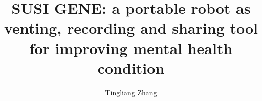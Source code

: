 \documentclass[manuscript,screen]{acmart}
\begin{document}
\title{SUSI GENE: a portable robot as venting, recording  and sharing tool for improving mental health condition}



\author{Tingliang Zhang}







\renewcommand{\shortauthors}{Zhang Tingliang.}
\end{document}
